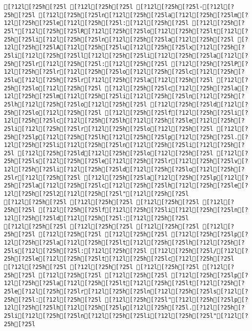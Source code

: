 \documentclass{scrartcl}
\begin{document}
\begin{Verbatim}
[?12l[?25h[?25l [?12l[?25h[?25l [?12l[?25h[?25l-[?12l[?25h[?25l [?12l[?25h[?25ln[?12l[?25h[?25la[?12l[?25h[?25lm[?12l[?25h[?25le[?12l[?25h[?25l:[?12l[?25h[?25l [?12l[?25h[?25l"[?12l[?25h[?25lR[?12l[?25h[?25lo[?12l[?25h[?25lt[?12l[?25h[?25li[?12l[?25h[?25ln[?12l[?25h[?25la[?12l[?25h[?25l [?12l[?25h[?25lA[?12l[?25h[?25lu[?12l[?25h[?25lx[?12l[?25h[?25li[?12l[?25h[?25ll[?12l[?25h[?25li[?12l[?25h[?25la[?12l[?25h[?25lr[?12l[?25h[?25l:[?12l[?25h[?25l [?12l[?25h[?25lP[?12l[?25h[?25lr[?12l[?25h[?25lo[?12l[?25h[?25lc[?12l[?25h[?25lu[?12l[?25h[?25lr[?12l[?25h[?25la[?12l[?25h[?25l [?12l[?25h[?25lo[?12l[?25h[?25l [?12l[?25h[?25lc[?12l[?25h[?25la[?12l[?25h[?25lm[?12l[?25h[?25li[?12l[?25h[?25ln[?12l[?25h[?25lh[?12l[?25h[?25lo[?12l[?25h[?25l [?12l[?25h[?25ld[?12l[?25h[?25lo[?12l[?25h[?25l [?12l[?25h[?25lf[?12l[?25h[?25li[?12l[?25h[?25lc[?12l[?25h[?25lh[?12l[?25h[?25le[?12l[?25h[?25li[?12l[?25h[?25lr[?12l[?25h[?25lo[?12l[?25h[?25l [?12l[?25h[?25lp[?12l[?25h[?25lh[?12l[?25h[?25lp[?12l[?25h[?25l.[?12l[?25h[?25li[?12l[?25h[?25ln[?12l[?25h[?25li[?12l[?25h[?25l [?12l[?25h[?25ld[?12l[?25h[?25lo[?12l[?25h[?25l [?12l[?25h[?25ls[?12l[?25h[?25le[?12l[?25h[?25lr[?12l[?25h[?25lv[?12l[?25h[?25li[?12l[?25h[?25ld[?12l[?25h[?25lo[?12l[?25h[?25lr[?12l[?25h[?25l [?12l[?25h[?25la[?12l[?25h[?25lp[?12l[?25h[?25la[?12l[?25h[?25lc[?12l[?25h[?25lh[?12l[?25h[?25le[?12l[?25h[?25l2[?12l[?25h[?25l"[?12l[?25h[?25l
[?12l[?25h[?25l [?12l[?25h[?25l [?12l[?25h[?25l [?12l[?25h[?25l [?12l[?25h[?25lf[?12l[?25h[?25li[?12l[?25h[?25ln[?12l[?25h[?25ld[?12l[?25h[?25l:[?12l[?25h[?25l
[?12l[?25h[?25l [?12l[?25h[?25l [?12l[?25h[?25l [?12l[?25h[?25l [?12l[?25h[?25l [?12l[?25h[?25l [?12l[?25h[?25lp[?12l[?25h[?25la[?12l[?25h[?25lt[?12l[?25h[?25lh[?12l[?25h[?25ls[?12l[?25h[?25l:[?12l[?25h[?25l [?12l[?25h[?25l/[?12l[?25h[?25le[?12l[?25h[?25lt[?12l[?25h[?25lc[?12l[?25h[?25l
[?12l[?25h[?25l [?12l[?25h[?25l [?12l[?25h[?25l [?12l[?25h[?25l [?12l[?25h[?25l [?12l[?25h[?25l [?12l[?25h[?25lp[?12l[?25h[?25la[?12l[?25h[?25lt[?12l[?25h[?25lt[?12l[?25h[?25le[?12l[?25h[?25lr[?12l[?25h[?25ln[?12l[?25h[?25ls[?12l[?25h[?25l:[?12l[?25h[?25l [?12l[?25h[?25l"[?12l[?25h[?25lp[?12l[?25h[?25lh[?12l[?25h[?25lp[?12l[?25h[?25l.[?12l[?25h[?25li[?12l[?25h[?25ln[?12l[?25h[?25li[?12l[?25h[?25l"[?12l[?25h[?25l

\end{Verbatim}
\end{document}
